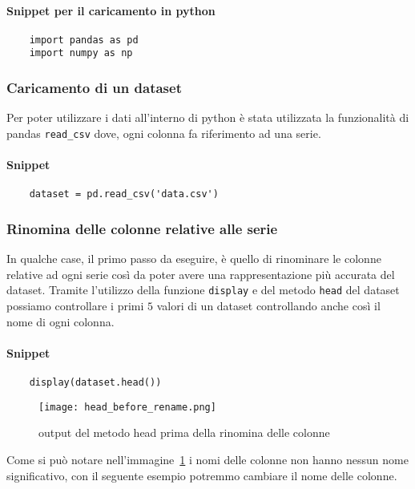 \paragraph{Snippet per il caricamento in python}
\begin{verbatim}
    import pandas as pd
    import numpy as np
\end{verbatim}



\subsubsection{Caricamento di un dataset}
Per poter utilizzare i dati all'interno di python è stata utilizzata
la funzionalità di pandas \texttt{read\_csv} dove, ogni colonna fa riferimento 
ad una serie.
\paragraph{Snippet}
\begin{verbatim}
    dataset = pd.read_csv('data.csv')
\end{verbatim}





\subsubsection{Rinomina delle colonne relative alle serie}
In qualche case, il primo passo da eseguire, è quello di rinominare
le colonne relative ad ogni serie così da poter avere una rappresentazione
più accurata del dataset.
Tramite l'utilizzo della funzione \texttt{display} e del metodo \texttt{head}
del dataset possiamo controllare i primi $5$ valori di un dataset
controllando anche così il nome di ogni colonna.
\paragraph{Snippet}
\begin{verbatim}
    display(dataset.head())
\end{verbatim}
\begin{figure}[h!]
    \texttt{[image: head\_before\_rename.png]}
    \caption{output del metodo head prima della rinomina delle colonne}
    \label{fig:head_before_rename}
\end{figure}
Come si può notare nell'immagine~\ref*{fig:head_before_rename} i nomi delle colonne 
non hanno nessun nome significativo, con il seguente esempio potremmo
cambiare il nome delle colonne.

